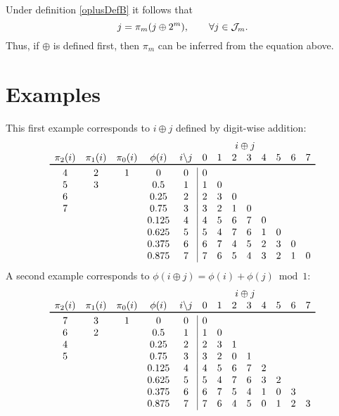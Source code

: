 \documentclass[12pt]{amsart}
\begin{document}
Under definition \eqref{oplusDefB} it follows that 
\begin{equation*}
    j = \pi_m(j \oplus 2^m),  \qquad \forall j \in \mathcal{J}_m.
\end{equation*}
Thus, if $\oplus$ is defined first, then $\pi_m$ can be inferred from the equation above.



\section{Examples}

This first example corresponds to $i \oplus j$ defined by digit-wise addition:
\[
\begin{array}{ccccc|cccccccc}
&&&& \multicolumn{9}{c}{i \oplus j} \\
\pi_2(i) & \pi_1(i) &  \pi_0(i) & \phi(i) & \multicolumn{1}{c}{i\backslash j} & 0 & 1 & 2 & 3 & 4 & 5 & 6 & 7 \\ 
    \toprule
    4 & 2 & 1 & 0 & 0 & 0\\
    5 & 3 & & 0.5 & 1 & 1 & 0 \\
    6 & & & 0.25  & 2 & 2 & 3 & 0\\
    7 & & & 0.75  & 3 & 3 & 2 & 1 & 0\\
      & & & 0.125 & 4 & 4 & 5 & 6 & 7 & 0\\
      & & & 0.625 & 5 & 5 & 4 & 7 & 6 & 1 & 0\\
      & & & 0.375 & 6 & 6 & 7 & 4 & 5 & 2 & 3 & 0\\
      & & & 0.875 & 7 & 7 & 6 & 5 & 4 & 3 & 2 & 1 & 0\\
\end{array}
\]
A second example corresponds to $\phi(i \oplus j) = \phi(i) + \phi(j) \bmod 1$:
\[
\begin{array}{ccccc|ccccccccc}
&&&& \multicolumn{9}{c}{i \oplus j} \\
\pi_2(i) & \pi_1(i) &  \pi_0(i) & \phi(i) & \multicolumn{1}{c}{i\backslash j} & 0 & 1 & 2 & 3 & 4 & 5 & 6 & 7 \\ 
    \toprule
    7 & 3 & 1 & 0 & 0& 0\\
    6 & 2 & & 0.5 & 1 & 1 & 0 \\
    4 & & & 0.25  & 2 & 2 & 3 & 1\\
    5 & & & 0.75  & 3 & 3 & 2 & 0 & 1\\
      & & & 0.125 & 4 & 4 & 5 & 6 & 7 & 2\\
      & & & 0.625 & 5 & 5 & 4 & 7 & 6 & 3 & 2\\
      & & & 0.375 & 6 & 6 & 7 & 5 & 4 & 1 & 0 & 3\\
      & & & 0.875 & 7 & 7 & 6 & 4 & 5 & 0 & 1 & 2 & 3\\
\end{array}
\]
\end{document}
